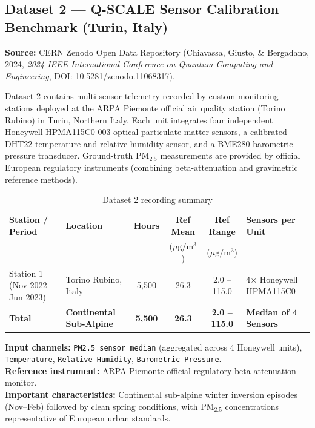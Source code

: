 \documentclass[11pt,a4paper]{article}
\begin{document}
\subsection{Dataset 2 --- Q-SCALE Sensor Calibration Benchmark (Turin, Italy)}
\textbf{Source:} CERN Zenodo Open Data Repository (Chiavassa, Giusto, \& Bergadano, 2024, \textit{2024 IEEE International Conference on Quantum Computing and Engineering}, DOI: 10.5281/zenodo.11068317).

Dataset 2 contains multi-sensor telemetry recorded by custom monitoring stations deployed at the ARPA Piemonte official air quality station (Torino Rubino) in Turin, Northern Italy. Each unit integrates four independent Honeywell HPMA115C0-003 optical particulate matter sensors, a calibrated DHT22 temperature and relative humidity sensor, and a BME280 barometric pressure transducer. Ground-truth $\text{PM}_{2.5}$ measurements are provided by official European regulatory instruments (combining beta-attenuation and gravimetric reference methods).

\begin{table}[htbp]
\centering
\small
\caption{Dataset 2 recording summary}
\label{tab:dataset2}
\begin{tabularx}{\textwidth}{l X c c c l}
\toprule
\textbf{Station / Period} & \textbf{Location} & \textbf{Hours} & \textbf{Ref Mean} & \textbf{Ref Range} & \textbf{Sensors per Unit} \\
& & & ($\mu\text{g}/\text{m}^3$) & ($\mu\text{g}/\text{m}^3$) & \\
\midrule
Station 1 (Nov 2022 -- Jun 2023) & Torino Rubino, Italy & 5,500 & 26.3 & 2.0 -- 115.0 & 4$\times$ Honeywell HPMA115C0 \\
\midrule
\textbf{Total} & \textbf{Continental Sub-Alpine} & \textbf{5,500} & \textbf{26.3} & \textbf{2.0 -- 115.0} & \textbf{Median of 4 Sensors} \\
\bottomrule
\end{tabularx}
\end{table}

\noindent \textbf{Input channels:} \texttt{PM2.5 sensor median} (aggregated across 4 Honeywell units), \texttt{Temperature}, \texttt{Relative Humidity}, \texttt{Barometric Pressure}. \\
\textbf{Reference instrument:} ARPA Piemonte official regulatory beta-attenuation monitor. \\
\textbf{Important characteristics:} Continental sub-alpine winter inversion episodes (Nov--Feb) followed by clean spring conditions, with $\text{PM}_{2.5}$ concentrations representative of European urban standards.
\end{document}
